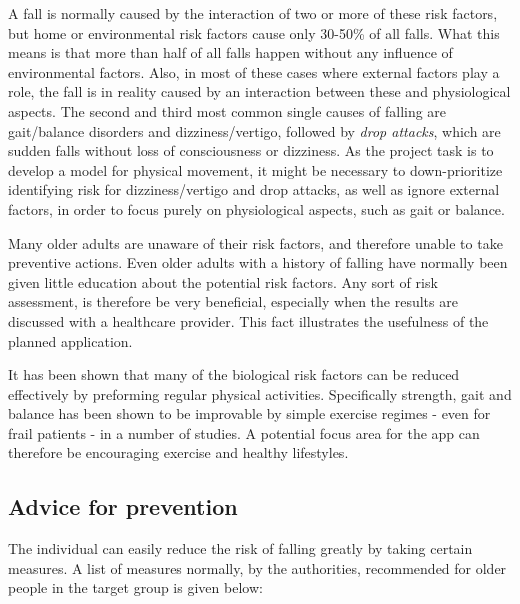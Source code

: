 A fall is normally caused by the interaction of two or more of these risk factors, but home or environmental risk factors cause only 30-50\% of all falls\cite{fallsRubenstein, cdcComProg}. What this means is that more than half of all falls happen without any influence of environmental factors. Also, in most of these cases where external factors play a role, the fall is in reality caused by an interaction between these and physiological aspects. The second and third most common single causes of falling are gait/balance disorders and dizziness/vertigo, followed by \emph{drop attacks}, which are sudden falls without loss of consciousness or dizziness\cite{fallsRubenstein}. As the project task is to develop a model for physical movement, it might be necessary to down-prioritize identifying risk for dizziness/vertigo and drop attacks, as well as ignore external factors, in order to focus purely on physiological aspects, such as gait or balance.

Many older adults are unaware of their risk factors, and therefore unable to take preventive actions. Even older adults with a history of falling have normally been given little education about the potential risk factors. Any sort of risk assessment, is therefore be very beneficial, especially when the results are discussed with a healthcare provider\cite{cdcComProg}. This fact illustrates the usefulness of the planned application. 

It has been shown that many of the biological risk factors can be reduced effectively by preforming regular physical activities. Specifically strength, gait and balance has been shown to be improvable by simple exercise regimes - even for frail patients - in a number of studies\cite{LMTassessPrev, cdcComProg, WHO}. A potential focus area for the app can therefore be encouraging exercise and healthy lifestyles.

\subsection{Advice for prevention}
The individual can easily reduce the risk of falling greatly by taking certain measures. A list of measures normally, by the authorities, recommended for older people in the target group is given below\cite{cdcYouPrevent}:

